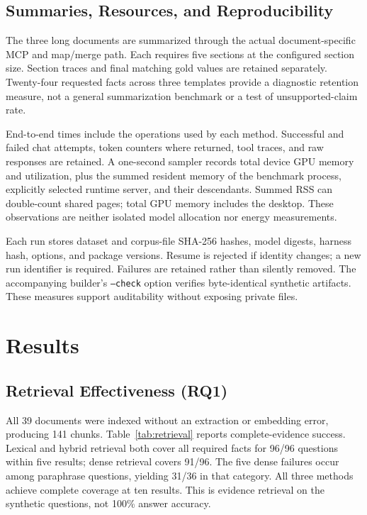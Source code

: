 \documentclass[conference,letterpaper]{IEEEtran}
\newcommand{\code}[1]{\texttt{#1}}
\begin{document}
\subsection{Summaries, Resources, and Reproducibility}
The three long documents are summarized through the actual document-specific MCP and map/merge path. Each requires five sections at the configured section size. Section traces and final matching gold values are retained separately. Twenty-four requested facts across three templates provide a diagnostic retention measure, not a general summarization benchmark or a test of unsupported-claim rate.

End-to-end times include the operations used by each method. Successful and failed chat attempts, token counters where returned, tool traces, and raw responses are retained. A one-second sampler records total device GPU memory and utilization, plus the summed resident memory of the benchmark process, explicitly selected runtime server, and their descendants. Summed RSS can double-count shared pages; total GPU memory includes the desktop. These observations are neither isolated model allocation nor energy measurements.

Each run stores dataset and corpus-file SHA-256 hashes, model digests, harness hash, options, and package versions. Resume is rejected if identity changes; a new run identifier is required. Failures are retained rather than silently removed. The accompanying builder's \code{--check} option verifies byte-identical synthetic artifacts. These measures support auditability without exposing private files.

\section{Results}
\subsection{Retrieval Effectiveness (RQ1)}
All 39 documents were indexed without an extraction or embedding error, producing 141 chunks. Table~\ref{tab:retrieval} reports complete-evidence success. Lexical and hybrid retrieval both cover all required facts for 96/96 questions within five results; dense retrieval covers 91/96. The five dense failures occur among paraphrase questions, yielding 31/36 in that category. All three methods achieve complete coverage at ten results. This is evidence retrieval on the synthetic questions, not 100\% answer accuracy.
\end{document}
